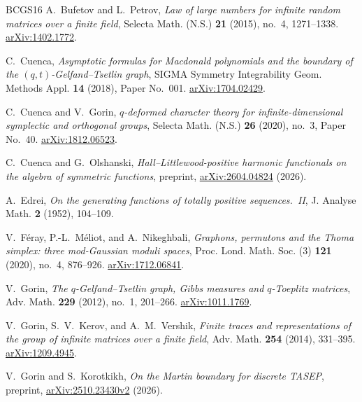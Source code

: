 \documentclass[11pt,reqno]{amsart}
\theoremstyle{definition}
\theoremstyle{remark}
\numberwithin{equation}{section}
\begin{document}
\begin{thebibliography}{BCGS16}
A.~Bufetov and L.~Petrov,
\emph{Law of large numbers for infinite random matrices over a finite field},
Selecta Math. (N.S.) \textbf{21} (2015), no.~4, 1271--1338.
\href{https://arxiv.org/abs/1402.1772}{arXiv:1402.1772}.

C.~Cuenca,
\emph{Asymptotic formulas for Macdonald polynomials and the boundary of the
$(q,t)$-Gelfand--Tsetlin graph},
SIGMA Symmetry Integrability Geom. Methods Appl. \textbf{14} (2018), Paper No.~001.
\href{https://arxiv.org/abs/1704.02429}{arXiv:1704.02429}.

C.~Cuenca and V.~Gorin,
\emph{$q$-deformed character theory for infinite-dimensional symplectic and
orthogonal groups},
Selecta Math. (N.S.) \textbf{26} (2020), no.~3, Paper No.~40.
\href{https://arxiv.org/abs/1812.06523}{arXiv:1812.06523}.

C.~Cuenca and G.~Olshanski,
\emph{Hall--Littlewood-positive harmonic functionals on the algebra of
symmetric functions},
preprint, \href{https://arxiv.org/abs/2604.04824}{arXiv:2604.04824} (2026).

A.~Edrei,
\emph{On the generating functions of totally positive sequences.~II},
J. Analyse Math. \textbf{2} (1952), 104--109.

V.~F\'eray, P.-L.~M\'eliot, and A.~Nikeghbali,
\emph{Graphons, permutons and the Thoma simplex: three mod-Gaussian moduli
spaces},
Proc. Lond. Math. Soc. (3) \textbf{121} (2020), no.~4, 876--926.
\href{https://arxiv.org/abs/1712.06841}{arXiv:1712.06841}.

V.~Gorin,
\emph{The $q$-Gelfand--Tsetlin graph, Gibbs measures and $q$-Toeplitz matrices},
Adv. Math. \textbf{229} (2012), no.~1, 201--266.
\href{https://arxiv.org/abs/1011.1769}{arXiv:1011.1769}.

V.~Gorin, S.~V.~Kerov, and A.~M.~Vershik,
\emph{Finite traces and representations of the group of infinite matrices
over a finite field},
Adv. Math. \textbf{254} (2014), 331--395.
\href{https://arxiv.org/abs/1209.4945}{arXiv:1209.4945}.

V.~Gorin and S.~Korotkikh,
\emph{On the Martin boundary for discrete TASEP},
preprint, \href{https://arxiv.org/abs/2510.23430v2}{arXiv:2510.23430v2} (2026).



\end{thebibliography}
\end{document}
